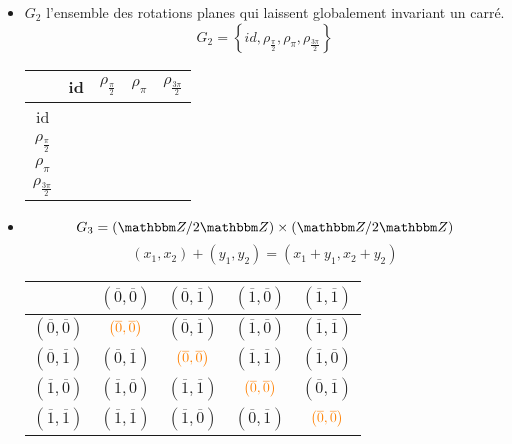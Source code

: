 \begin{exm}
\begin{itemize}
		\item $G_2$ l'ensemble des rotations planes qui laissent globalement invariant un carré.
			\[
				G_2 = \left\{ id, \rho_{\frac{\pi}{2}}, \rho_{\pi}, \rho_{\frac{3\pi}{2}} \right\}
			\] 
			\begin{center}
				\begin{tabular}{|c|c|c|c|c|}
					\hline
					\diagbox{$y$}{$x$} & id & $\rho_\frac{\pi}{2}$ & $\rho_\pi$ & $\rho_\frac{3\pi}{2}$\\\hline
					id & \color{orange}{id} & \color{green}{$\rho_\frac{\pi}{2}$} & \color{cyan}{$\rho_\pi$} & \color{magenta}{$\rho_\frac{3\pi}{2}$}\\\hline
					$\rho_\frac{\pi}{2}$ & \color{green}{$\rho_\frac{\pi}{2}$} & \color{cyan}{$\rho_\pi$} & \color{magenta}{$\rho_\frac{3\pi}{2}$} & \color{orange}{id}\\\hline
					$ \rho_\pi$ & \color{cyan}{$\rho_\pi$} & \color{magenta}{$\rho_\frac{3\pi}{2}$} & \color{orange}{id} & \color{green}{$\rho_\frac{\pi}{2}$}\\\hline
					$ \rho_\frac{3\pi}{2}$ & \color{magenta}{$\rho_\frac{3\pi}{2}$} & \color{orange}{id} & \color{green}{$\rho_\frac{\pi}{2}$} & \color{cyan}{$\rho_\pi$}\\\hline
				\end{tabular}
			\end{center}

		\item \[
		G_3 = (\Z / 2\Z) \times (\Z / 2\Z)
		\]\[
		(x_1,x_2)+(y_1,y_2) = (x_1+y_1,x_2+y_2)
		\] 
			\begin{center}
				\begin{tabular}{|c|c|c|c|c|}
					\hline
					&$\left(\overline{0},\overline{0}\right)$&$\left(\overline{0},\overline{1}\right)$&$\left(\overline{1},\overline{0}\right)$&$\left(\overline{1},\overline{1}\right)$\\
					\hline
					$\left(\overline{0},\overline{0}\right)$&$\color{orange}{\left(\overline{0},\overline{0}\right)}$&$\left(\overline{0},\overline{1}\right)$&$\left(\overline{1},\overline{0}\right)$&$\left(\overline{1},\overline{1}\right)$\\\hline
					$\left(\overline{0},\overline{1}\right)$&$\left(\overline{0},\overline{1}\right)$&$\color{orange}{\left(\overline{0},\overline{0}\right)}$&$\left(\overline{1},\overline{1}\right)$&$\left(\overline{1},\overline{0}\right)$\\\hline
					$\left(\overline{1},\overline{0}\right)$&$\left(\overline{1},\overline{0}\right)$&$\left(\overline{1},\overline{1}\right)$&$\color{orange}{\left(\overline{0},\overline{0}\right)}$&$\left(\overline{0},\overline{1}\right)$\\\hline
					$\left(\overline{1},\overline{1}\right)$&$\left(\overline{1},\overline{1}\right)$&$\left(\overline{1},\overline{0}\right)$&$\left(\overline{0},\overline{1}\right)$&$\color{orange}{\left(\overline{0},\overline{0}\right)}$\\\hline
				\end{tabular}
			\end{center}
	\end{itemize}
\end{exm}


